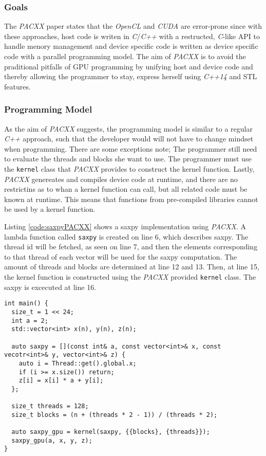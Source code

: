 \subsubsection{Goals}
The \textit{PACXX} paper states that the \textit{OpenCL} and \textit{CUDA} are error-prone since with these approaches, host code is writen in \textit{C}/\textit{C++} with a restructed, \textit{C}-like API to handle menory management and device specific code is written as device specific code with a parallel programming model. The aim of \textit{PACXX} is to avoid the praditional pitfalls of GPU programming by unifying host and device code and thereby allowing the programmer to stay, express herself using \textit{C++14} and STL features.

\subsubsection{Programming Model}
As the aim of \textit{PACXX} suggests, the programming model is similar to a regular \textit{C++} approach, such that the developer would will not have to change mindset when programming. There are some exceptions note; The programmer still need to evaluate the threads and blocks she want to use. The programmer must use the \texttt{kernel} class that \textit{PACXX} provides to construct the kernel function. Lastly, \textit{PACXX} genereates and compiles device code at runtime, and there are no restrictins as to whan a kernel function can call, but all related code must be known at runtime. This means that functions from pre-compiled libraries cannot be used by a kernel function.

Listing \ref{code:saxpyPACXX} shows a saxpy implementation using \textit{PACXX}. A lambda function called \texttt{saxpy} is created on line 6, which describes saxpy. The thread id will be fetched, as seen on line 7, and then the elements corresponding to that thread of each vector will be used for the saxpy computation. The amount of threads and blocks are determined at line 12 and 13. Then, at line 15, the kernel function is constructed using the \textit{PACXX} provided \texttt{kernel} class. The saxpy is excecuted at line 16.

\begin{lstlisting}[caption={saxpy made with PACXX.}, label={code:saxpyPACXX}]
int main() {
  size_t = 1 << 24;
  int a = 2;
  std::vector<int> x(n), y(n), z(n);

  auto saxpy = [](const int& a, const vector<int>& x, const vecotr<int>& y, vector<int>& z) {
    auto i = Thread::get().global.x;
    if (i >= x.size()) return;
    z[i] = x[i] * a + y[i];
  };

  size_t threads = 128;
  size_t blocks = (n + (threads * 2 - 1)) / (threads * 2);

  auto saxpy_gpu = kernel(saxpy, {{blocks}, {threads}});
  saxpy_gpu(a, x, y, z);
}
\end{lstlisting}

